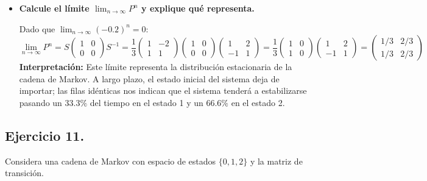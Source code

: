 \documentclass[10pt,a4paper]{book}
\begin{document}
\begin{itemize}
    \item[\textbf{e)}] 

\vspace{0.2cm}
        
    \textbf{Calcule el límite $\lim_{n \to \infty} P^n$ y explique qué representa.}
    
\vspace{0.2cm}
     
    Dado que $\lim_{n \to \infty} (-0.2)^n = 0$:
    \[ \lim_{n \to \infty} P^n = S \begin{pmatrix} 1 & 0 \\ 0 & 0 \end{pmatrix} S^{-1} = \frac{1}{3} \begin{pmatrix} 1 & -2 \\ 1 & 1 \end{pmatrix} \begin{pmatrix} 1 & 0 \\ 0 & 0 \end{pmatrix} \begin{pmatrix} 1 & 2 \\ -1 & 1 \end{pmatrix} = \frac{1}{3} \begin{pmatrix} 1 & 0 \\ 1 & 0 \end{pmatrix} \begin{pmatrix} 1 & 2 \\ -1 & 1 \end{pmatrix} = \begin{pmatrix} 1/3 & 2/3 \\ 1/3 & 2/3 \end{pmatrix} \]
    \textbf{Interpretación:} Este límite representa la distribución estacionaria de la cadena de Markov. A largo plazo, el estado inicial del sistema deja de importar; las filas idénticas nos indican que el sistema tenderá a estabilizarse pasando un $33.3\%$ del tiempo en el estado 1 y un $66.6\%$ en el estado 2.
\end{itemize}

\newpage

\subsection*{Ejercicio 11.} Considera una cadena de Markov con espacio de estados $\{0,1,2\}$ y la matriz de transición.

\vspace{0.2cm}
\end{document}
